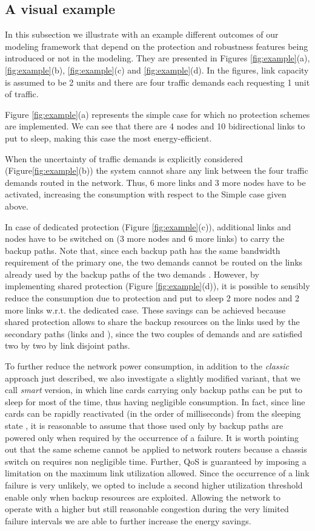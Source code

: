 \documentclass[final,5p,times,twocolumn]{elsarticle}
\begin{document}
\subsection{A visual example}
In this subsection we illustrate with an example different outcomes of our modeling framework
that depend on the protection and robustness features being introduced or not in the modeling.
They are presented in
Figures \ref{fig:example}(a), \ref{fig:example}(b), \ref{fig:example}(c) and \ref{fig:example}(d).
In the figures, link capacity is assumed to be 2 units and there are four traffic demands each requesting 1 unit of traffic.

Figure \ref{fig:example}(a) represents the simple case for which no protection schemes are implemented.
We can see that
there are 4 nodes and 10 bidirectional links to put to sleep, making this case the most energy-efficient.

When the uncertainty of traffic demands is explicitly considered  (Figure\ref{fig:example}(b)) the system cannot share any link between the four traffic demands routed in the network. Thus, 6 more links and 3 more nodes have to be activated, increasing the consumption with respect to the Simple case given above.

In case of dedicated protection (Figure \ref{fig:example}(c)), additional links and nodes have to be switched on (3 more nodes and 6 more links) to carry the backup paths. 
Note that, since each backup path has the same bandwidth requirement of the primary one, the two demands  cannot be routed on the links already used by the backup paths of the two demands . However, by implementing shared protection (Figure \ref{fig:example}(d)), it is possible to sensibly reduce the consumption due to protection and put to sleep 2 more nodes and 2 more links w.r.t. the dedicated case. These savings can be achieved because shared protection allows to share the backup resources on the links used by the secondary paths (links  and ), since the two couples of demands  and  are satisfied two by two by link disjoint paths.

To further reduce the network power consumption, in addition to the \textit{classic} approach just described, we also investigate  a slightly modified variant, that we call \textit{smart} version, in which line cards carrying only backup paths can be put to sleep for most of the time, thus having negligible consumption. In fact, since line cards can be rapidly reactivated (in the order of milliseconds) from the sleeping state \cite{hays07}, it is reasonable to assume that those used only by  backup paths are powered only when required by the occurrence of a failure. 
It is worth pointing out that the same scheme cannot be applied to network routers because a chassis switch on requires non negligible time. Further, QoS is guaranteed by imposing a limitation on the maximum link utilization allowed. Since the occurrence of a link failure is very unlikely, we opted to include a second higher utilization threshold enable only when backup resources are exploited. Allowing the network to operate with a higher but still reasonable congestion during the very limited failure intervals we are able to further increase the energy savings.
\end{document}
